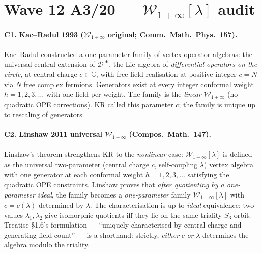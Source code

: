 
\providecommand{\Wilpha}{\mathcal{W}_{1+\infty}}
\providecommand{\gghone}{\widehat{\mathfrak{gl}}_1}
\providecommand{\eps}{\epsilon}
\providecommand{\kch}{\kappa_{\mathrm{ch}}}

\section*{Wave 12 A3/20 — $\Wilpha[\lambda]$ audit}

\paragraph{C1. Kac--Radul 1993 ($\mathcal{W}_{1+\infty}$ original; Comm.\ Math.\ Phys.\ 157).}
Kac--Radul constructed a one-parameter family of vertex operator algebras:
the universal central extension of $\mathcal{D}^{\mathrm{ch}}$, the Lie
algebra of \emph{differential operators on the circle}, at central charge
$c \in \mathbb{C}$, with free-field realisation at positive integer
$c = N$ via $N$ free complex fermions. Generators exist at every integer
conformal weight $h = 1, 2, 3, \ldots$ with one field per weight. The
family is the \emph{linear} $\mathcal{W}_{1+\infty}$ (no quadratic OPE
corrections). KR called this parameter $c$; the family is unique up to
rescaling of generators.

\paragraph{C2. Linshaw 2011 universal $\Wilpha$ (Compos.\ Math.\ 147).}
Linshaw's theorem strengthens KR to the \emph{nonlinear} case:
$\Wilpha[\lambda]$ is defined as the universal two-parameter
(central charge $c$, self-coupling $\lambda$) vertex algebra with one
generator at each conformal weight $h = 1, 2, 3, \ldots$ satisfying the
quadratic OPE constraints. Linshaw proves that \emph{after quotienting
by a one-parameter ideal}, the family becomes a \emph{one-parameter}
family $\Wilpha[\lambda]$ with $c = c(\lambda)$ determined by $\lambda$.
The characterisation is up to \emph{ideal} equivalence: two values
$\lambda_1, \lambda_2$ give isomorphic quotients iff they lie on the
same triality $S_3$-orbit. Treatise §1.6's formulation --- ``uniquely
characterised by central charge and generating-field count'' --- is a
shorthand: strictly, \emph{either} $c$ \emph{or} $\lambda$ determines
the algebra modulo the triality.

